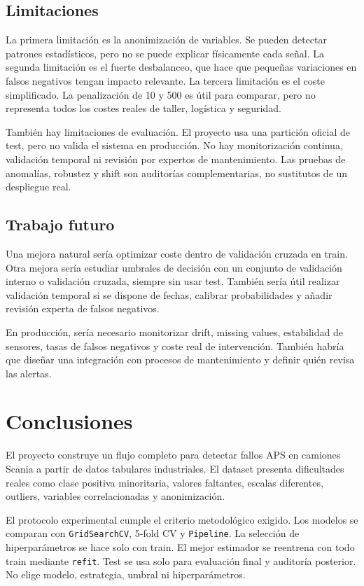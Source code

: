 \documentclass[11pt,a4paper]{article}
\begin{document}
\subsection{Limitaciones}

La primera limitación es la anonimización de variables. Se pueden detectar patrones estadísticos, pero no se puede explicar físicamente cada señal. La segunda limitación es el fuerte desbalanceo, que hace que pequeñas variaciones en falsos negativos tengan impacto relevante. La tercera limitación es el coste simplificado. La penalización de 10 y 500 es útil para comparar, pero no representa todos los costes reales de taller, logística y seguridad.

También hay limitaciones de evaluación. El proyecto usa una partición oficial de test, pero no valida el sistema en producción. No hay monitorización continua, validación temporal ni revisión por expertos de mantenimiento. Las pruebas de anomalías, robustez y shift son auditorías complementarias, no sustitutos de un despliegue real.

\subsection{Trabajo futuro}

Una mejora natural sería optimizar coste dentro de validación cruzada en train. Otra mejora sería estudiar umbrales de decisión con un conjunto de validación interno o validación cruzada, siempre sin usar test. También sería útil realizar validación temporal si se dispone de fechas, calibrar probabilidades y añadir revisión experta de falsos negativos.

En producción, sería necesario monitorizar drift, missing values, estabilidad de sensores, tasas de falsos negativos y coste real de intervención. También habría que diseñar una integración con procesos de mantenimiento y definir quién revisa las alertas.

\section{Conclusiones}
\label{sec_conclusiones}

El proyecto construye un flujo completo para detectar fallos APS en camiones Scania a partir de datos tabulares industriales. El dataset presenta dificultades reales como clase positiva minoritaria, valores faltantes, escalas diferentes, outliers, variables correlacionadas y anonimización.

El protocolo experimental cumple el criterio metodológico exigido. Los modelos se comparan con \texttt{GridSearchCV}, 5-fold CV y \texttt{Pipeline}. La selección de hiperparámetros se hace solo con train. El mejor estimador se reentrena con todo train mediante \texttt{refit}. Test se usa solo para evaluación final y auditoría posterior. No elige modelo, estrategia, umbral ni hiperparámetros.
\end{document}
